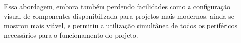 Essa abordagem, embora também perdendo facilidades como a configuração visual de componentes disponibilizada para projetos mais modernos, ainda se mostrou mais viável, e permitiu a utilização simultânea de todos os periféricos necessários para o funcionamento do projeto.
\color{orange}















